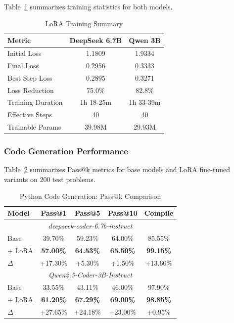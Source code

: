 \documentclass[conference]{IEEEtran}
\begin{document}
Table~\ref{tab:lora_training} summarizes training statistics for both models.

\begin{table}[htbp]
\caption{LoRA Training Summary}
\begin{center}
\begin{tabular}{|l|c|c|}
\hline
\textbf{Metric} & \textbf{DeepSeek 6.7B} & \textbf{Qwen 3B} \\
\hline
Initial Loss & 1.1809 & 1.9334 \\
Final Loss & 0.2956 & 0.3333 \\
Best Step Loss & 0.2895 & 0.3271 \\
Loss Reduction & 75.0\% & 82.8\% \\
\hline
Training Duration & 1h 18-25m & 1h 33-39m \\
Effective Steps & 40 & 40 \\
Trainable Params & 39.98M & 29.93M \\
\hline
\end{tabular}
\label{tab:lora_training}
\end{center}
\end{table}

\subsubsection{Code Generation Performance}
Table~\ref{tab:lora_results} summarizes Pass@k metrics for base models and LoRA fine-tuned variants on 200 test problems.

\begin{table}[htbp]
\caption{Python Code Generation: Pass@k Comparison}
\begin{center}
\begin{tabular}{|l|c|c|c|c|}
\hline
\textbf{Model} & \textbf{Pass@1} & \textbf{Pass@5} & \textbf{Pass@10} & \textbf{Compile} \\
\hline
\multicolumn{5}{|c|}{\textit{deepseek-coder-6.7b-instruct}} \\
\hline
Base & 39.70\% & 59.23\% & 64.00\% & 85.55\% \\
+ LoRA & \textbf{57.00\%} & \textbf{64.53\%} & \textbf{65.50\%} & \textbf{99.15\%} \\
$\Delta$ & +17.30\% & +5.30\% & +1.50\% & +13.60\% \\
\hline
\multicolumn{5}{|c|}{\textit{Qwen2.5-Coder-3B-Instruct}} \\
\hline
Base & 33.55\% & 43.11\% & 46.00\% & 97.90\% \\
+ LoRA & \textbf{61.20\%} & \textbf{67.29\%} & \textbf{69.00\%} & \textbf{98.85\%} \\
$\Delta$ & +27.65\% & +24.18\% & +23.00\% & +0.95\% \\
\hline
\end{tabular}
\label{tab:lora_results}
\end{center}
\end{table}
\end{document}
